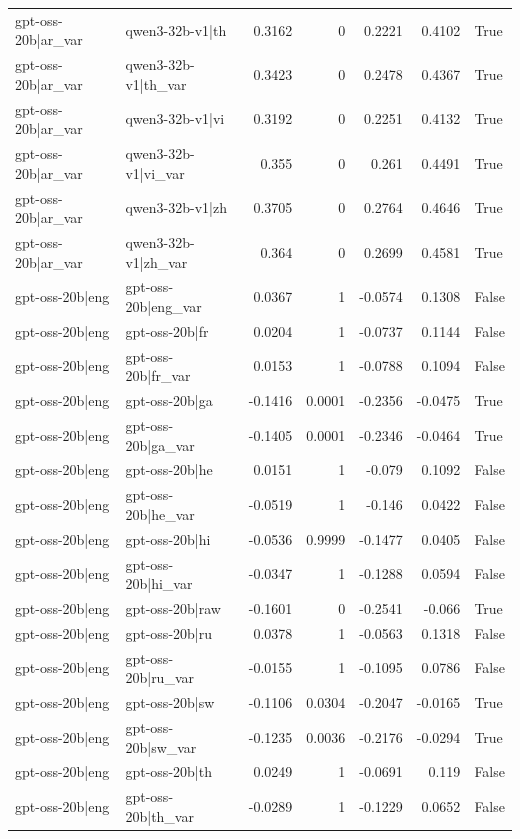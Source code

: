 \begin{table}
\begin{tabular}{l l r r r r l}
gpt-oss-20b|ar_var & qwen3-32b-v1|th & 0.3162 & 0 & 0.2221 & 0.4102 & True \\
gpt-oss-20b|ar_var & qwen3-32b-v1|th_var & 0.3423 & 0 & 0.2478 & 0.4367 & True \\
gpt-oss-20b|ar_var & qwen3-32b-v1|vi & 0.3192 & 0 & 0.2251 & 0.4132 & True \\
gpt-oss-20b|ar_var & qwen3-32b-v1|vi_var & 0.355 & 0 & 0.261 & 0.4491 & True \\
gpt-oss-20b|ar_var & qwen3-32b-v1|zh & 0.3705 & 0 & 0.2764 & 0.4646 & True \\
gpt-oss-20b|ar_var & qwen3-32b-v1|zh_var & 0.364 & 0 & 0.2699 & 0.4581 & True \\
gpt-oss-20b|eng & gpt-oss-20b|eng_var & 0.0367 & 1 & -0.0574 & 0.1308 & False \\
gpt-oss-20b|eng & gpt-oss-20b|fr & 0.0204 & 1 & -0.0737 & 0.1144 & False \\
gpt-oss-20b|eng & gpt-oss-20b|fr_var & 0.0153 & 1 & -0.0788 & 0.1094 & False \\
gpt-oss-20b|eng & gpt-oss-20b|ga & -0.1416 & 0.0001 & -0.2356 & -0.0475 & True \\
gpt-oss-20b|eng & gpt-oss-20b|ga_var & -0.1405 & 0.0001 & -0.2346 & -0.0464 & True \\
gpt-oss-20b|eng & gpt-oss-20b|he & 0.0151 & 1 & -0.079 & 0.1092 & False \\
gpt-oss-20b|eng & gpt-oss-20b|he_var & -0.0519 & 1 & -0.146 & 0.0422 & False \\
gpt-oss-20b|eng & gpt-oss-20b|hi & -0.0536 & 0.9999 & -0.1477 & 0.0405 & False \\
gpt-oss-20b|eng & gpt-oss-20b|hi_var & -0.0347 & 1 & -0.1288 & 0.0594 & False \\
gpt-oss-20b|eng & gpt-oss-20b|raw & -0.1601 & 0 & -0.2541 & -0.066 & True \\
gpt-oss-20b|eng & gpt-oss-20b|ru & 0.0378 & 1 & -0.0563 & 0.1318 & False \\
gpt-oss-20b|eng & gpt-oss-20b|ru_var & -0.0155 & 1 & -0.1095 & 0.0786 & False \\
gpt-oss-20b|eng & gpt-oss-20b|sw & -0.1106 & 0.0304 & -0.2047 & -0.0165 & True \\
gpt-oss-20b|eng & gpt-oss-20b|sw_var & -0.1235 & 0.0036 & -0.2176 & -0.0294 & True \\
gpt-oss-20b|eng & gpt-oss-20b|th & 0.0249 & 1 & -0.0691 & 0.119 & False \\
gpt-oss-20b|eng & gpt-oss-20b|th_var & -0.0289 & 1 & -0.1229 & 0.0652 & False \\

\end{tabular}
\end{table}
